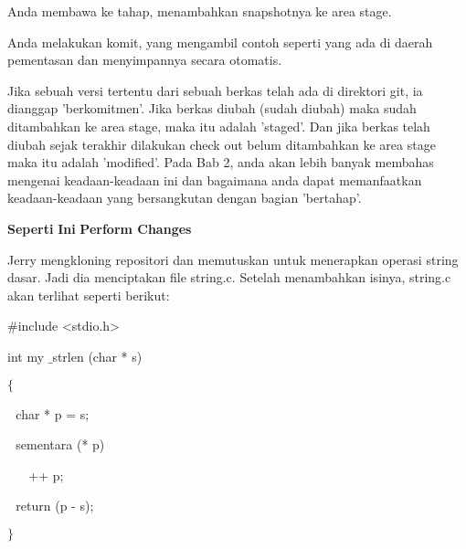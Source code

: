 \noindent 
Anda membawa ke tahap, menambahkan snapshotnya ke area stage. \par
\noindent 
Anda melakukan komit, yang mengambil contoh seperti yang ada di daerah pementasan dan menyimpannya secara otomatis. \par
\noindent 
Jika sebuah versi tertentu dari sebuah berkas telah ada di direktori git, ia dianggap 'berkomitmen'. Jika berkas diubah (sudah diubah) maka sudah ditambahkan ke area stage, maka itu adalah 'staged'. Dan jika berkas telah diubah sejak terakhir dilakukan check out belum ditambahkan ke area stage maka itu adalah 'modified'. Pada Bab 2, anda akan lebih banyak membahas mengenai keadaan-keadaan ini dan bagaimana anda dapat memanfaatkan keadaan-keadaan yang bersangkutan dengan bagian 'bertahap'. \par
\vspace{12pt}
\noindent 
{\fontsize{14pt}{14pt}\selectfont \textbf{Seperti}\textbf{ }\textbf{Ini}\textbf{ Perform Changes} \\} \par
\noindent 
Jerry mengkloning repositori dan memutuskan untuk menerapkan operasi string dasar. Jadi dia menciptakan file string.c. Setelah menambahkan isinya, string.c akan terlihat seperti berikut: \par
\vspace{12pt}
\noindent 
 \hspace*{0.5in}  $  \#  $include <stdio.h> \par
\vspace{12pt}
\noindent 
 \hspace*{0.5in} int my $  \_  $strlen (char * s) \par
\noindent 
 \hspace*{0.5in}  $  \{  $ \par
\noindent 
 \hspace*{0.5in}  $  $ $  $ $  $char * p = s; \par
\vspace{12pt}
\noindent 
 \hspace*{0.5in}  $  $ $  $ $  $sementara (* p) \par
\noindent 
 \hspace*{0.5in}  $  $ $  $ $  $ $  $ $  $ $  $++ p; \par
\vspace{12pt}
\noindent 
 \hspace*{0.5in}  $  $ $  $ $  $return (p - s); \par
\noindent 
 \hspace*{0.5in}  $  \}  $ \par
